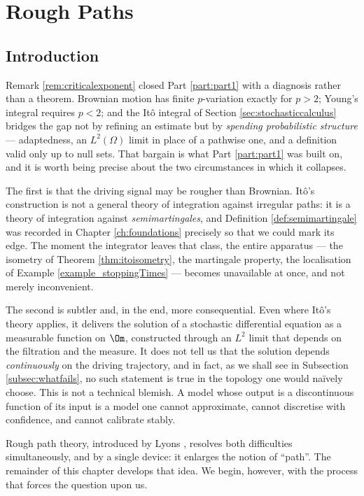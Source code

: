 \chapter{Rough Paths} \label{ch:roughpaths}

\section{Introduction}\label{sec:roughintro}

Remark \ref{rem:criticalexponent} closed Part \ref{part:part1} with a diagnosis rather than a
theorem. Brownian motion has finite $p$-variation exactly for $p>2$; Young's integral requires
$p<2$; and the Itô integral of Section \ref{sec:stochasticcalculus} bridges the gap not by refining
an estimate but by \emph{spending probabilistic structure} --- adaptedness, an $L^2(\Omega)$ limit
in place of a pathwise one, and a definition valid only up to null sets. That bargain is what
Part \ref{part:part1} was built on, and it is worth being precise about the two circumstances in
which it collapses.

The first is that the driving signal may be rougher than Brownian. Itô's construction is not a
general theory of integration against irregular paths: it is a theory of integration against
\emph{semimartingales}, and Definition \ref{def:semimartingale} was recorded in Chapter
\ref{ch:foundations} precisely so that we could mark its edge. The moment the integrator leaves that
class, the entire apparatus --- the isometry of Theorem \ref{thm:itoisometry}, the martingale
property, the localisation of Example \ref{example_stoppingTimes} --- becomes unavailable at once,
and not merely inconvenient.

The second is subtler and, in the end, more consequential. Even where Itô's theory applies, it
delivers the solution of a stochastic differential equation as a measurable function on $\Om$,
constructed through an $L^2$ limit that depends on the filtration and the measure. It does not
tell us that the solution depends \emph{continuously} on the driving trajectory, and in fact, as
we shall see in Subsection \ref{subsec:whatfails}, no such statement is true in the topology one
would naïvely choose. This is not a technical blemish. A model whose output is a discontinuous
function of its input is a model one cannot approximate, cannot discretise with confidence, and
cannot calibrate stably.

Rough path theory, introduced by Lyons \cite{lyons1998}, resolves both difficulties simultaneously,
and by a single device: it enlarges the notion of ``path''. The remainder of this chapter develops
that idea. We begin, however, with the process that forces the question upon us.

